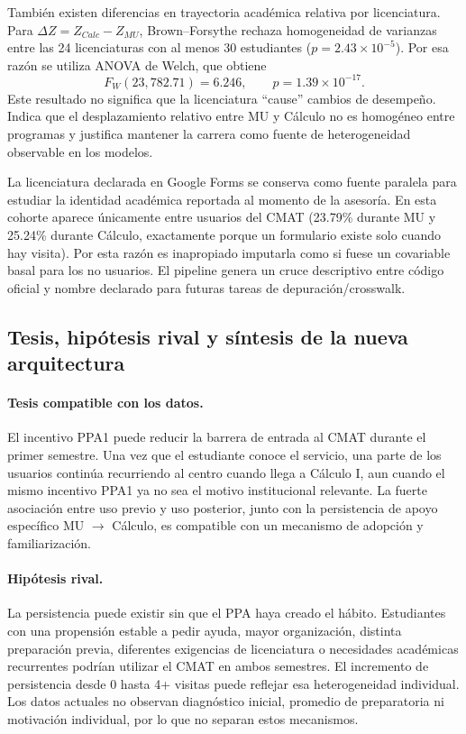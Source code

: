 También existen diferencias en trayectoria académica relativa por licenciatura. Para $\Delta Z=Z_{Calc}-Z_{MU}$, Brown--Forsythe rechaza homogeneidad de varianzas entre las 24 licenciaturas con al menos 30 estudiantes ($p=2.43\times10^{-5}$). Por esa razón se utiliza ANOVA de Welch, que obtiene
\[
F_W(23,782.71)=6.246,\qquad p=1.39\times10^{-17}.
\]
Este resultado no significa que la licenciatura ``cause'' cambios de desempeño. Indica que el desplazamiento relativo entre MU y Cálculo no es homogéneo entre programas y justifica mantener la carrera como fuente de heterogeneidad observable en los modelos.

La licenciatura declarada en Google Forms se conserva como fuente paralela para estudiar la identidad académica reportada al momento de la asesoría. En esta cohorte aparece únicamente entre usuarios del CMAT (23.79\% durante MU y 25.24\% durante Cálculo, exactamente porque un formulario existe solo cuando hay visita). Por esta razón es inapropiado imputarla como si fuese un covariable basal para los no usuarios. El pipeline genera un cruce descriptivo entre código oficial y nombre declarado para futuras tareas de depuración/crosswalk.

\subsection{Tesis, hipótesis rival y síntesis de la nueva arquitectura}

\paragraph{Tesis compatible con los datos.}
El incentivo PPA1 puede reducir la barrera de entrada al CMAT durante el primer semestre. Una vez que el estudiante conoce el servicio, una parte de los usuarios continúa recurriendo al centro cuando llega a Cálculo I, aun cuando el mismo incentivo PPA1 ya no sea el motivo institucional relevante. La fuerte asociación entre uso previo y uso posterior, junto con la persistencia de apoyo específico MU $\rightarrow$ Cálculo, es compatible con un mecanismo de adopción y familiarización.

\paragraph{Hipótesis rival.}
La persistencia puede existir sin que el PPA haya creado el hábito. Estudiantes con una propensión estable a pedir ayuda, mayor organización, distinta preparación previa, diferentes exigencias de licenciatura o necesidades académicas recurrentes podrían utilizar el CMAT en ambos semestres. El incremento de persistencia desde 0 hasta 4+ visitas puede reflejar esa heterogeneidad individual. Los datos actuales no observan diagnóstico inicial, promedio de preparatoria ni motivación individual, por lo que no separan estos mecanismos.

